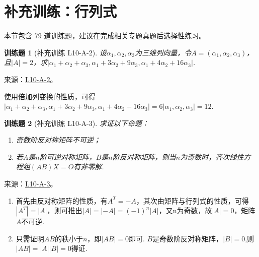 \documentclass[12pt,fontset=fandol]{ctexart}
\newtheorem{exercise}{训练题}[section]
\begin{document}
\section{补充训练：行列式}

本节包含 79 道训练题，建议在完成相关专题真题后选择性练习。

\begin{exercise}[补充训练 L10-A-2]\label{prob:L10-A-2}
设$\alpha_1,\alpha_2,\alpha_3$为三维列向量，令$A=(\alpha_1,\alpha_2,\alpha_3)$，且$|A|=2$，求$|\alpha_1+\alpha_2+\alpha_3,\alpha_1+3\alpha_2+9\alpha_3,\alpha_1+4\alpha_2+16\alpha_3|$.
\end{exercise}
\noindent 来源：\href{https://github.com/yhwu-is/Linear-Algebra-Left-Undone/blob/new/%E8%AE%B2%E4%B9%89/%E4%B8%93%E9%A2%98/10%20%E8%A1%8C%E5%88%97%E5%BC%8F.tex}{L10-A-2}。
\begin{solve}
使用倍加列变换的性质，可得$|\alpha_1+\alpha_2+\alpha_3,\alpha_1+3\alpha_2+9\alpha_3,\alpha_1+4\alpha_2+16\alpha_3|=6|\alpha_1,\alpha_2,\alpha_3|=12$.
\end{solve}

\begin{exercise}[补充训练 L10-A-3]\label{prob:L10-A-3}
求证以下命题：
        \begin{enumerate}
            \item 奇数阶反对称矩阵不可逆；

            \item 若$A$是$n$阶可逆对称矩阵，$B$是$n$阶反对称矩阵，则当$n$为奇数时，齐次线性方程组$(AB)X=O$有非零解.
        \end{enumerate}
\end{exercise}
\noindent 来源：\href{https://github.com/yhwu-is/Linear-Algebra-Left-Undone/blob/new/%E8%AE%B2%E4%B9%89/%E4%B8%93%E9%A2%98/10%20%E8%A1%8C%E5%88%97%E5%BC%8F.tex}{L10-A-3}。
\begin{solve}
\begin{enumerate}
                \item 首先由反对称矩阵的性质，有$A^T=-A$，其次由矩阵与行列式的性质，可得$|A^T|=|A|$，则可推出$|A|=|-A|=(-1)^n|A|$，又n为奇数，故$|A|=0$，矩阵$A$不可逆.

                \item 只需证明$AB$的秩小于$n$，即$|AB|=0$即可. $B$是奇数阶反对称矩阵，$|B|=0$,则$|AB|=|A||B|=0$得证.
            \end{enumerate}
\end{solve}
\end{document}
